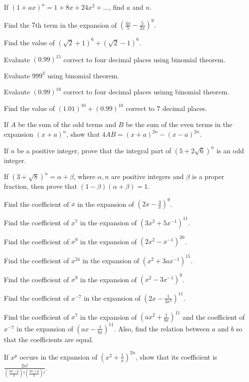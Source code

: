 \item If $(1 + ax)^n = 1 + 8x + 24x^2 + \ldots$, find $a$ and $n$.
\item Find the $7$th term in the expansion of $\left(\frac{4x}{5} - \frac{5}{2x}\right)^9$.
\item Find the value of $(\sqrt{2} + 1)^6 + (\sqrt{2} - 1)^6$.
\item Evaluate $(0.99)^{15}$ correct to four decimal places using binomial theorem.
\item Evaluate $999^3$ using binomial theorem.
\item Evalaute $(0.99)^{10}$ correct to four decimal places usinng binomial theorem.
\item Find the value of $(1.01)^{10} + (0.99)^{10}$ correct to $7$ decimal places.
\item If $A$ be the sum of the odd terms and $B$ be the sum of the even terms in the expansion $(x + a)^n$, show that $4AB = (x +
  a)^{2n} - (x - a)^{2n}$.
\item If $n$ be a positive integer, prove that the integral part of $(5 + 2\sqrt{6})^n$ is an odd integer.
\item If $(3 + \sqrt{8})^n = \alpha + \beta$, where $\alpha, n$ are positive integers and $\beta$ is a proper fraction, then prove
  that $(1 - \beta)(\alpha + \beta) = 1$.
\item Find the coefficient of $x$ in the expansion of $\left(2x - \frac{3}{x}\right)^9$.
\item Find the coefficient of $x^7$ in the expansion of $(3x^2 + 5x^{-1})^{11}$.
\item Find the coefficient of $x^9$ in the expansion of $(2x^2 - x^{-1})^{20}$.
\item Find the coefficient of $x^{24}$ in the expansion of $(x^2 + 3ax^{-1})^{15}$.
\item Find the coefficient of $x^9$ in the expansion of $(x^2 - 3x^{-1})^9$.
\item Find the coefficient of $x^{-7}$ in the expansion of $\left(2x - \frac{1}{3x^2}\right)^{11}$.
\item Find the coefficient of $x^7$ in the expansion of $\left(ax^2 + \frac{1}{bx}\right)^{11}$ and the coefficient of $x^{-7}$ in
  the expansion of $\left(ax - \frac{1}{bx}\right)^{11}$. Also, find the relation between $a$ and $b$ so that the coefficients are
  equal.
\item If $x^p$ occurs in the expansion of $\left(x^2 + \frac{1}{x}\right)^{2n}$, show that its coefficient is
  $\frac{2n!}{\left(\frac{4n - p}{3}\right)!\left(\frac{2n + p}{3}\right)!}$.
